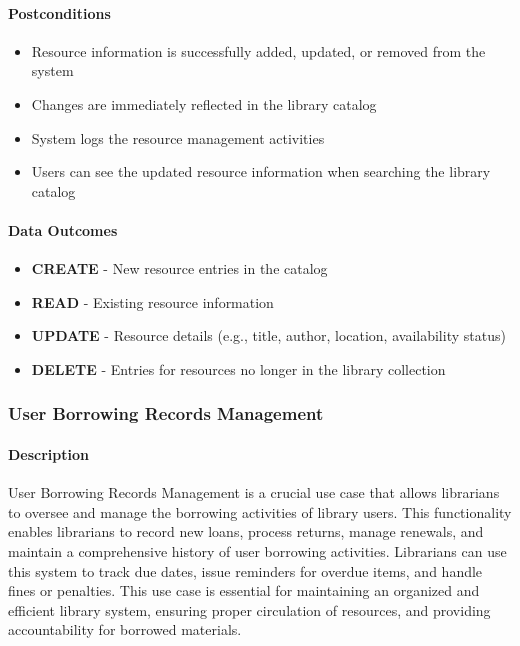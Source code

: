 \paragraph{Postconditions}
\begin{itemize}
    \item Resource information is successfully added, updated, or removed from the system
    \item Changes are immediately reflected in the library catalog
    \item System logs the resource management activities
    \item Users can see the updated resource information when searching the library catalog
\end{itemize}

\paragraph{Data Outcomes}
\begin{itemize}
    \item \textbf{CREATE} - New resource entries in the catalog
    \item \textbf{READ} - Existing resource information
    \item \textbf{UPDATE} - Resource details (e.g., title, author, location, availability status)
    \item \textbf{DELETE} - Entries for resources no longer in the library collection
\end{itemize}

\subsubsection{User Borrowing Records Management}

\paragraph{Description}
User Borrowing Records Management is a crucial use case that allows librarians to oversee and manage the borrowing activities of library users. This functionality enables librarians to record new loans, process returns, manage renewals, and maintain a comprehensive history of user borrowing activities. Librarians can use this system to track due dates, issue reminders for overdue items, and handle fines or penalties. This use case is essential for maintaining an organized and efficient library system, ensuring proper circulation of resources, and providing accountability for borrowed materials.

